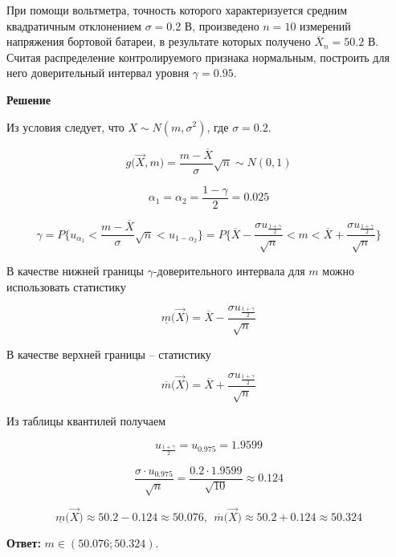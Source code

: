 При помощи вольтметра, точность которого характеризуется средним квадратичным отклонением $\sigma = 0.2$ В, произведено $n = 10$ измерений напряжения бортовой батареи, в результате которых получено $\overline X_n = 50.2$ В. Считая распределение контролируемого признака нормальным, построить для него доверительный интервал уровня $\gamma = 0.95$.

\textbf{Решение}

Из условия следует, что $X \sim N(m, \sigma^2)$, где $\sigma = 0.2$.

\begin{equation*}
    g \big( \vec X, m \big) = \frac{m - \overline X}{\sigma} \sqrt{n} \sim N(0,1)
\end{equation*}

\begin{equation*}
    \alpha_1 = \alpha_2 = \frac{1 - \gamma}{2} = 0.025
\end{equation*}

\begin{equation*}
    \gamma = P \bigg\{ u_{\alpha_1} < \frac{m - \overline X}{\sigma} \sqrt{n} < u_{1 - \alpha_2} \bigg\} = P \bigg\{ \overline X - \frac{\sigma u_\frac{1+\gamma}{2}}{\sqrt{n}} < m < \overline X + \frac{\sigma u_\frac{1+\gamma}{2}}{\sqrt{n}} \bigg\}
\end{equation*}

В качестве нижней границы $\gamma$-доверительного интервала для $m$ можно использовать статистику

\begin{equation*}
    \underline m \big( \vec X \big) = \overline X - \frac{\sigma u_\frac{1+\gamma}{2}}{\sqrt{n}}
\end{equation*}

В качестве верхней границы -- статистику

\begin{equation*}
    \overline m \big( \vec X \big) = \overline X + \frac{\sigma u_\frac{1+\gamma}{2}}{\sqrt{n}}
\end{equation*}

Из таблицы квантилей получаем

\begin{equation*}
    u_{\frac{1+\gamma}{2}} = u_{0.975} = 1.9599
\end{equation*}

\begin{equation*}
    \frac{\sigma \cdot u_{0.975}}{\sqrt{n}} = \frac{0.2 \cdot 1.9599}{\sqrt{10}} \approx 0.124
\end{equation*}

\begin{equation*}
    \underline m \big( \vec X \big) \approx 50.2 - 0.124 \approx 50.076,\ \ \overline m \big( \vec X \big) \approx 50.2 + 0.124 \approx 50.324
\end{equation*}

\textbf{Ответ:} $m \in (50.076; 50.324)$.
